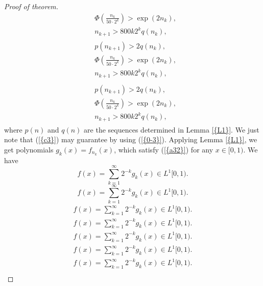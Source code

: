 \documentclass{amsart}
\numberwithin{equation}{section}
\begin{document}
\begin{proof}[Proof of theorem]
{\begin{multline}
&\Phi\left(\frac{n_k}{50\cdot 2^k}\right)>\exp(2n_k),\label{c3}\\
&n_{k+1}>800k2^kq(n_k),\label{c4}
\end{multline}\fi  
{}\begin{multline*}\begin{split}
&p(n_{k+1})>2q(n_k),\label{c2}\\
&\Phi\left(\frac{n_k}{50\cdot 2^k}\right)>\exp(2n_k),\label{c3}\\
&n_{k+1}>800k2^kq(n_k),\label{c4}
\end{split}\end{multline*}\fi
{}\begin{multline}\begin{split}
&p(n_{k+1})>2q(n_k),\label{c2}\\
&\Phi\left(\frac{n_k}{50\cdot 2^k}\right)>\exp(2n_k),\label{c3}\\
&n_{k+1}>800k2^kq(n_k),\label{c4}
\end{split}\end{multline}\fi
}
where $p(n)$ and $q(n)$ are the sequences determined in {Lemma \ref{{L1}}}. We just note that  {(\ref{{c3}})} may guarantee by using {(\ref{{0-3}})}. Applying {Lemma \ref{{L1}}}, we get polynomials $g_k(x)=f_{n_k}(x)$, which satisfy {(\ref{{a32}})} for any $x\in [0,1)$. We have
{
\begin{equation*} 
f(x)=\sum_{k=1}^\infty2^{-k}g_k(x)\in L^1[0,1).
 \end{equation*}\fi  
{}\begin{equation}
f(x)=\sum_{k=1}^\infty2^{-k}g_k(x)\in L^1[0,1).
\end{equation}\fi   
{}\begin{align*}
f(x)=\sum_{k=1}^\infty2^{-k}g_k(x)\in L^1[0,1).
\end{align*}\fi   
{}\begin{align}
f(x)=\sum_{k=1}^\infty2^{-k}g_k(x)\in L^1[0,1).
\end{align}\fi    
{}\begin{gather*}
f(x)=\sum_{k=1}^\infty2^{-k}g_k(x)\in L^1[0,1).
\end{gather*}\fi  
{}\begin{gather}
f(x)=\sum_{k=1}^\infty2^{-k}g_k(x)\in L^1[0,1).
\end{gather}\fi   
{}\begin{multline*}
f(x)=\sum_{k=1}^\infty2^{-k}g_k(x)\in L^1[0,1).
\end{multline*}\fi  
{}\begin{multline}

\end{multline}}
\end{proof}
\end{document}
